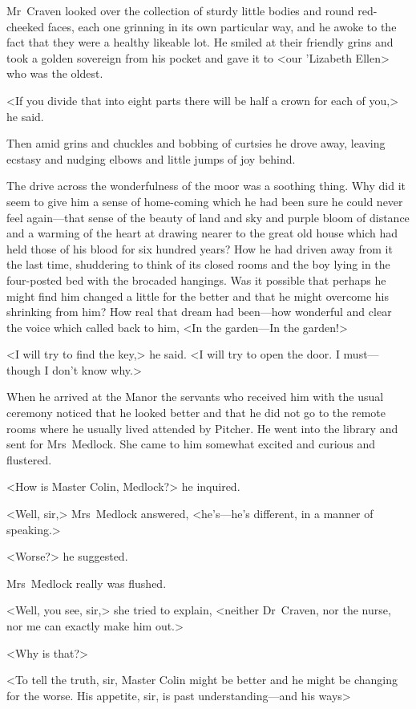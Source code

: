 Mr~Craven looked over the collection of sturdy little bodies and round red-cheeked faces, each one grinning in its own particular way, and he awoke to the fact that they were a healthy likeable lot. He smiled at their friendly grins and took a golden sovereign from his pocket and gave it to <our 'Lizabeth Ellen> who was the oldest.

<If you divide that into eight parts there will be half a crown for each of you,> he said.

Then amid grins and chuckles and bobbing of curtsies he drove away, leaving ecstasy and nudging elbows and little jumps of joy behind.

The drive across the wonderfulness of the moor was a soothing thing. Why did it seem to give him a sense of home-coming which he had been sure he could never feel again—that sense of the beauty of land and sky and purple bloom of distance and a warming of the heart at drawing nearer to the great old house which had held those of his blood for six hundred years? How he had driven away from it the last time, shuddering to think of its closed rooms and the boy lying in the four-posted bed with the brocaded hangings. Was it possible that perhaps he might find him changed a little for the better and that he might overcome his shrinking from him? How real that dream had been—how wonderful and clear the voice which called back to him, <In the garden—In the garden!>

<I will try to find the key,> he said. <I will try to open the door. I must—though I don't know why.>

When he arrived at the Manor the servants who received him with the usual ceremony noticed that he looked better and that he did not go to the remote rooms where he usually lived attended by Pitcher. He went into the library and sent for Mrs~Medlock. She came to him somewhat excited and curious and flustered.

<How is Master Colin, Medlock?> he inquired.

<Well, sir,> Mrs~Medlock answered, <he's—he's different, in a manner of speaking.>

<Worse?> he suggested.

Mrs~Medlock really was flushed.

<Well, you see, sir,> she tried to explain, <neither Dr~Craven, nor the nurse, nor me can exactly make him out.>

<Why is that?>

<To tell the truth, sir, Master Colin might be better and he might be changing for the worse. His appetite, sir, is past understanding—and his ways\longdash>

